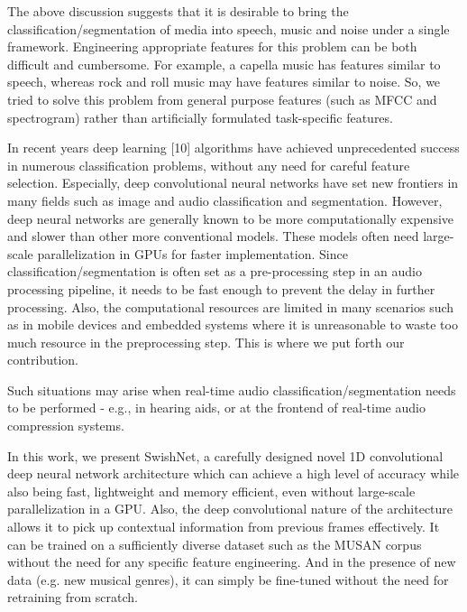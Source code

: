 \documentclass{article}
\begin{document}
The above discussion suggests that it is desirable to bring the classification/segmentation of media into speech, music and noise under a single framework. Engineering appropriate features for this problem can be both difficult and cumbersome. For example, a capella music has features similar to speech, whereas rock and roll music may have features similar to noise. So, we tried to solve this problem from general purpose features (such as MFCC and spectrogram) rather than artificially formulated task-specific features. 

In recent years deep learning [10] algorithms have achieved unprecedented success in numerous classification problems, without any need for careful feature selection. Especially, deep convolutional neural networks have set new frontiers in many fields such as image and audio classification and segmentation. However, deep neural networks are generally known to be more computationally expensive and slower than other more conventional models. These models often need large-scale parallelization in GPUs for faster implementation. Since classification/segmentation is often set as a pre-processing step in an audio processing pipeline, it needs to be fast enough to prevent the delay in further processing. Also, the computational resources are limited in many scenarios such as in mobile devices and embedded systems where it is unreasonable to waste too much resource in the preprocessing step. This is where we put forth our contribution. 

Such situations may arise when real-time audio classification/segmentation needs to be performed - e.g., in hearing aids, or at the frontend of real-time audio compression systems.

In this work, we present SwishNet, a carefully designed novel 1D convolutional deep neural network architecture which can achieve a high level of accuracy while also being fast, lightweight and memory efficient, even without large-scale parallelization in a GPU. Also, the deep convolutional nature of the architecture allows it to pick up contextual information from previous frames effectively. It can be trained on a sufficiently diverse dataset such as the MUSAN corpus without the need for any specific feature engineering. And in the presence of new data (e.g. new musical genres), it can simply be fine-tuned without the need for retraining from scratch.
\end{document}
